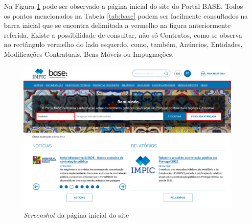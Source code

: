%	
%


\begin{table}[h!]
	\centering
	\caption{Documentação suplementar disponível no Portal BASE}
	\label{tab:base}
\end{table}

Na Figura \ref{fig:site1} pode ser observado a página inicial do site do Portal BASE. Todos os pontos mencionados na Tabela \ref{tab:base} podem ser facilmente consultados na barra inicial que se encontra delimitada a vermelho na figura anteriormente referida. Existe a possibilidade de consultar, não só Contratos, como se observa no rectângulo vermelho do lado esquerdo, como, também, Anúncios, Entidades, Modificações Contratuais, Bens Móveis ou Impugnações. 

\begin{figure}[H]
	\centering
	\includegraphics[width=.95\textwidth]{imagens/portalbase_init_v2.png}
	\caption{\textit{Screenshot} da página inicial do site}
	\label{fig:site1}
\end{figure}

